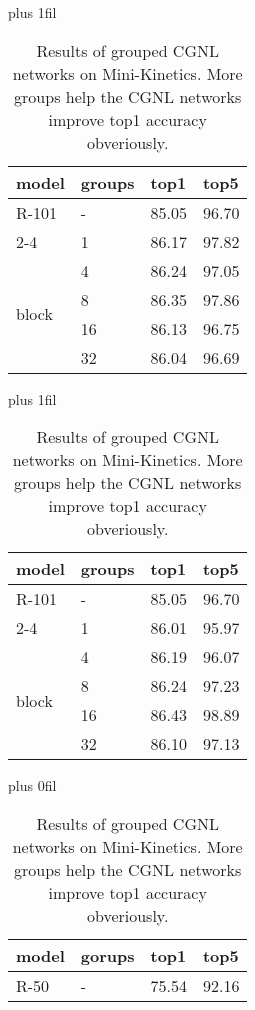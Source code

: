 \documentclass{article}
\begin{document}
\begin{table}[t]
\begin{minipage}[t]{0.66\textwidth}
\begin{subtable}[t]{1.0\textwidth}
{{}}
\label{table:groups on cub}
\scriptsize
\centering
\vskip 4pt plus 1fil
\begin{tabular}{llll}
  \toprule
  \multicolumn{1}{c}{model}   & groups    & top1        & top5   \\
  \midrule
  R-101                       & -         & 85.05       & 96.70  \\
  \cmidrule(r){2-4}
  \multirow{4}{*}{+ 1 CGNL}   & 1         & 86.17       & 97.82  \\
  \multirow{4}{*}{block}      & 4         & 86.24       & 97.05  \\
                              & 8         & 86.35       & 97.86  \\
                              & 16        & 86.13       & 96.75  \\
                              & 32        & 86.04       & 96.69  \\
  \bottomrule
\end{tabular}
\hskip 3pt plus 1fil
\begin{tabular}{llll}
  \toprule
  \multicolumn{1}{c}{model}   & groups    & top1        & top5   \\
  \midrule
  R-101                       & -         & 85.05       & 96.70  \\
  \cmidrule(r){2-4}
  \multirow{4}{*}{+ 5 CGNL}   & 1         & 86.01       & 95.97  \\
  \multirow{4}{*}{block}      & 4         & 86.19       & 96.07  \\
                              & 8         & 86.24       & 97.23  \\
                              & 16        & 86.43       & 98.89  \\
                              & 32        & 86.10       & 97.13  \\
  \bottomrule
\end{tabular}
\end{subtable}
\begin{subtable}[t]{1.0\textwidth}
\caption{\small{
  Results of grouped CGNL networks on Mini-Kinetics.
  More groups help the CGNL networks improve top1 accuracy obveriously.
}}
\label{table:groups on mini-kinetics}
\scriptsize
\centering
\vskip 1.9pt plus 0fil
\begin{tabular}[t]{llll}
  \toprule
  model                             & gorups    & top1    & top5    \\
  \midrule
  R-50                              & -         & 75.54   & 92.16   \\

\end{tabular}
\end{subtable}
\end{minipage}
\end{table}
\end{document}
